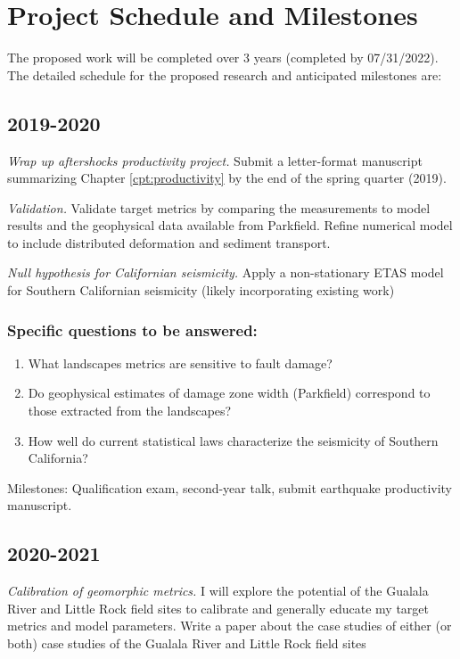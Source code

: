 \documentclass[12pt, notitlepage]{report}
\begin{document}
\chapter{Project Schedule and Milestones}\label{cpt:plan}

The proposed work will be completed over 3 years (completed by 07/31/2022). The detailed schedule for the proposed research and anticipated milestones are:

\section*{2019-2020}
\textit{Wrap up aftershocks productivity project.} Submit a letter-format manuscript summarizing Chapter \ref{cpt:productivity} by the end of the spring quarter (2019).

\textit{Validation.} Validate target metrics by comparing the measurements to model results and the geophysical data available from Parkfield. Refine numerical model to include distributed deformation and sediment transport.

\textit{Null hypothesis for Californian seismicity.} Apply a non-stationary ETAS model for Southern Californian seismicity (likely incorporating existing work)

\textit{}

\subsection*{Specific questions to be answered:}
\begin{enumerate}
    \item What landscapes metrics are sensitive to fault damage?
    \item Do geophysical estimates of damage zone width (Parkfield) correspond to those extracted from the landscapes?
    \item How well do current statistical laws characterize the seismicity of Southern California?
\end{enumerate}

Milestones: Qualification exam, second-year talk, submit earthquake productivity manuscript.

\section*{2020-2021}

\textit{Calibration of geomorphic metrics.} I will explore the potential of the Gualala River and Little Rock field sites to calibrate and generally educate my target metrics and model parameters. Write a paper about the case studies of either (or both) case studies of the Gualala River and Little Rock field sites
\end{document}
